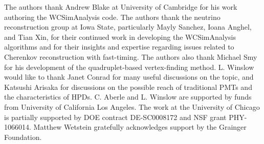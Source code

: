 \documentclass[cits]{JINST}
\begin{document}


\acknowledgments
The authors thank Andrew Blake at University of Cambridge for his work
authoring the WCSimAnalysis code. The authors thank the neutrino
reconstruction group at Iowa State, particularly Mayly Sanchez, Ioana
Anghel, and Tian Xin, for their continued work in developing the
WCSimAnalysis algorithms and for their insights and expertise
regarding issues related to Cherenkov reconstruction with
fast-timing. The authors also thank Michael Smy for his development of
the quadruplet-based vertex-finding method. L. Winslow would like to
thank Janet Conrad for many useful discussions on the topic, and
Katsushi Arisaka for discussions on the possible reach of traditional PMTs
and the characteristics of HPDs. C. Aberle and L. Winslow are
supported by funds from University of California Los Angeles. The work
at the University of Chicago is partially supported by DOE
contract DE-SC0008172 and NSF grant PHY-1066014. Matthew Wetstein gratefully
acknowledges support by the Grainger Foundation.

\newpage


 
\end{document}
